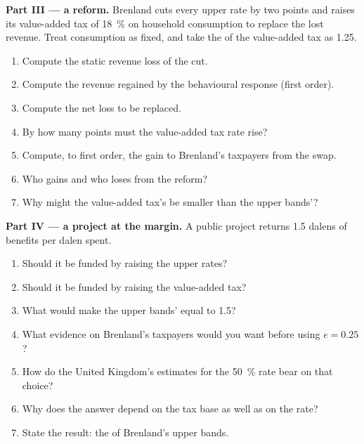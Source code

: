 \begin{problem}
\medskip\noindent\textbf{Part III --- a reform.} Brenland cuts every upper rate by two
points and raises its value-added tax of 18~\% on household consumption to replace
the lost revenue. Treat consumption as fixed, and take the  of the value-added tax as 1.25.
\begin{enumerate}[resume]
\item Compute the static revenue loss of the cut.
\item Compute the revenue regained by the behavioural response (first order).
\item Compute the net loss to be replaced.
\item By how many points must the value-added tax rate rise?
\item Compute, to first order, the gain to Brenland's taxpayers from the swap.
\item Who gains and who loses from the reform?
\item Why might the value-added tax's  be smaller than
the upper bands'?
\end{enumerate}

\medskip\noindent\textbf{Part IV --- a project at the margin.} A public project
returns 1.5 dalens of benefits per dalen spent.
\begin{enumerate}[resume]
\item Should it be funded by raising the upper rates?
\item Should it be funded by raising the value-added tax?
\item What  would make the upper bands'  equal to 1.5?
\item What evidence on Brenland's taxpayers would you want before using $e = 0.25$?
\item How do the United Kingdom's estimates for the 50~\% rate bear on that choice?
\item Why does the answer depend on the tax base as well as on the rate?
\item State the result: the  of Brenland's upper bands.
\end{enumerate}
\end{problem}
